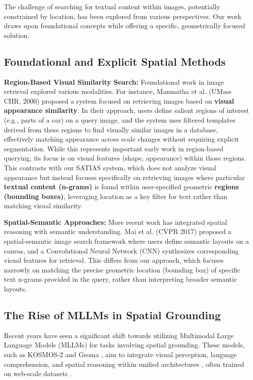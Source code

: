 \documentclass[manuscript,screen]{acmart}
\begin{document}
The challenge of searching for textual content within images, potentially constrained by location, has been explored from various perspectives. Our work draws upon foundational concepts while offering a specific, geometrically focused solution.

\subsection{Foundational and Explicit Spatial Methods}

\textbf{Region-Based Visual Similarity Search:} Foundational work in image retrieval explored various modalities. For instance, Manmatha et al. (UMass CIIR, 2000) \cite{Manmatha00} proposed a system focused on retrieving images based on \textbf{visual appearance similarity}. In their approach, users define salient regions of interest (e.g., parts of a car) on a query image, and the system uses filtered templates derived from these regions to find visually similar images in a database, effectively matching appearance across scale changes without requiring explicit segmentation. While this represents important early work in region-based querying, its focus is on visual features (shape, appearance) within those regions. This contrasts with our SATIAS system, which does not analyze visual appearance but instead focuses specifically on retrieving images where particular \textbf{textual content (n-grams)} is found within user-specified geometric \textbf{regions (bounding boxes)}, leveraging location as a key filter for text rather than matching visual similarity.

\textbf{Spatial-Semantic Approaches:} More recent work has integrated spatial reasoning with semantic understanding. Mai et al. (CVPR 2017) \cite{Mai17} proposed a spatial-semantic image search framework where users define semantic layouts on a canvas, and a Convolutional Neural Network (CNN) synthesizes corresponding visual features for retrieval. This differs from our approach, which focuses narrowly on matching the precise geometric location (bounding box) of specific text n-grams provided in the query, rather than interpreting broader semantic layouts.

\subsection{The Rise of MLLMs in Spatial Grounding}

Recent years have seen a significant shift towards utilizing Multimodal Large Language Models (MLLMs) for tasks involving spatial grounding. These models, such as KOSMOS-2 \cite{Huang24} and Groma \cite{Yin24}, aim to integrate visual perception, language comprehension, and spatial reasoning within unified architectures \cite{Wang23UniIR}, often trained on web-scale datasets \cite{Huang24}.
\end{document}

